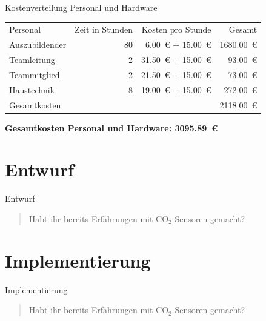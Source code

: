\documentclass[10pt,ngerman]{beamer}
\begin{document}
\begin{frame}[fragile]{Kostenverteilung Personal und Hardware}
  \begin{table}[htbp]
    \centering
    \begin{tabular}{lrrr}
      Personal       & Zeit in Stunden & Kosten pro Stunde              & Gesamt          \\
      Auszubildender & 80              & \SI{6.00}{€} + \SI{15.00}{€}   & \SI{1680.00}{€} \\
      Teamleitung    & 2               & \SI{31.50}{€}  + \SI{15.00}{€} & \SI{93.00}{€}   \\
      Teammitglied   & 2               & \SI{21.50}{€}  + \SI{15.00}{€} & \SI{73.00}{€}   \\
      Haustechnik    & 8               & \SI{19.00}{€}  + \SI{15.00}{€} & \SI{272.00}{€}  \\ \hline
      Gesamtkosten   &                 &                                & \SI{2118.00}{€}
    \end{tabular}
  \end{table}

  \vspace{0.4cm}

  \textbf{Gesamtkosten Personal und Hardware: \SI{3095.89}{€}}
\end{frame}



\section{Entwurf}
\begin{frame}[fragile]{Entwurf}
  \begin{minipage}[t]{1\textwidth}
    \begin{quotation}
      Habt ihr bereits Erfahrungen mit CO$_2$-Sensoren gemacht?
    \end{quotation}
  \end{minipage}
\end{frame}

\section{Implementierung}
\begin{frame}[fragile]{Implementierung}
  \begin{minipage}[t]{1\textwidth}
    \begin{quotation}
      Habt ihr bereits Erfahrungen mit CO$_2$-Sensoren gemacht?
    \end{quotation}
  \end{minipage}
\end{frame}
\end{document}
